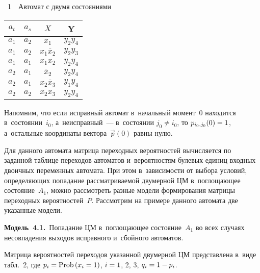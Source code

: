 \begin{multicols}{2}
{\small   %
\begin{center}
{{\tablename~1}\ \ \small{Автомат с двумя состояниями}}
\vspace*{2ex}


\tabcolsep=14pt
\begin{tabular}{|c|c|c|c|}
\hline
$a_t$ & $a_s$ & $X$ & Y\\
\hline
$a_1$ & $a_2$ & $\overline{x}_1$ & $y_2y_4$\\
$a_1$& $a_2$& $x_1\overline{x}_2$ & $y_2y_3$\\
$a_1$& $a_1$ & $x_1x_2$ & $y_2y_4$\\
$a_2$ & $a_1$ & $\overline{x}_2$ & $y_2y_4$\\
$a_2$& $a_1$ & $x_2\overline{x}_3$ & $y_1y_4$\\
$a_2$& $a_2$ & $x_2x_3$& $y_2y_4$\\
\hline
\end{tabular}
\end{center}
\vspace*{12pt}
}



\addtocounter{table}{1}
     
     Напомним, что если исправный автомат в~начальный момент~0 
находится в~состоянии~$i_0$, а~неисправный~--- в~состоянии $j_0\not= i_0$, 
то $p_{i_0,j_0}(0)\hm=1$, а~остальные координаты вектора~$\vec{p}(0)$ равны 
нулю.



    Для данного автомата матрица переходных вероятностей вычисляется по 
заданной таблице переходов автоматов и~вероятностям булевых единиц 
входных двоичных переменных автомата.
%
     При этом в~зависимости от выбора условий, определяющих попадание 
рассматриваемой двумерной ЦМ в~поглощающее состояние~$A_1$, можно 
рассмотреть разные модели формирования матрицы переходных 
вероятностей~$P$. Рассмотрим на примере данного автомата две указанные 
модели.
     
     \smallskip
     
     \noindent
     \textbf{Модель~4.1.}\ Попадание ЦМ в~поглощающее состояние~$A_1$ 
во всех случаях несовпадения выходов исправного и~сбойного автоматов. 
     
     \smallskip
     
     Матрица вероятностей переходов указанной двумерной ЦМ представлена в~виде табл.~2, где $p_i\hm=\mathrm{Prob}\left(x_i\hm=1\right)$, $i\hm= 1$, 2, 3, 
$q_i\hm=1\hm- p_i$.
        

\end{multicols}
